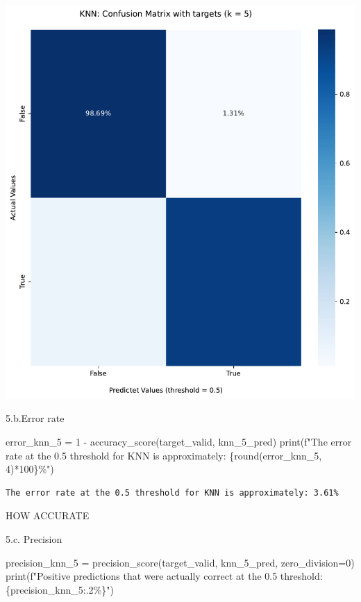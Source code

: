 \documentclass[
  11pt,
  letterpaper,
  DIV=11,
  numbers=noendperiod]{scrartcl}
\newenvironment{Shaded}{\begin{snugshade}}{\end{snugshade}}
\newcommand{\BuiltInTok}[1]{\textcolor[rgb]{0.00,0.23,0.31}{#1}}
\newcommand{\DecValTok}[1]{\textcolor[rgb]{0.68,0.00,0.00}{#1}}
\newcommand{\NormalTok}[1]{\textcolor[rgb]{0.00,0.23,0.31}{#1}}
\newcommand{\OperatorTok}[1]{\textcolor[rgb]{0.37,0.37,0.37}{#1}}
\newcommand{\SpecialCharTok}[1]{\textcolor[rgb]{0.37,0.37,0.37}{#1}}
\newcommand{\SpecialStringTok}[1]{\textcolor[rgb]{0.13,0.47,0.30}{#1}}
\begin{document}
\includegraphics{mp2_files/figure-pdf/cell-13-output-1.pdf}

5.b.Error rate

\begin{Shaded}
\begin{Highlighting}[]
\NormalTok{error\_knn\_5 }\OperatorTok{=} \DecValTok{1} \OperatorTok{{-}}\NormalTok{ accuracy\_score(target\_valid, knn\_5\_pred)}
\BuiltInTok{print}\NormalTok{(}\SpecialStringTok{f"The error rate at the 0.5 threshold for KNN is approximately: }\SpecialCharTok{\{}\BuiltInTok{round}\NormalTok{(error\_knn\_5, }\DecValTok{4}\NormalTok{)}\OperatorTok{*}\DecValTok{100}\SpecialCharTok{\}}\SpecialStringTok{\%"}\NormalTok{)}
\end{Highlighting}
\end{Shaded}

\begin{verbatim}
The error rate at the 0.5 threshold for KNN is approximately: 3.61%
\end{verbatim}

HOW ACCURATE

5.c. Precision

\begin{Shaded}
\begin{Highlighting}[]
\NormalTok{precision\_knn\_5 }\OperatorTok{=}\NormalTok{ precision\_score(target\_valid, knn\_5\_pred, zero\_division}\OperatorTok{=}\DecValTok{0}\NormalTok{)}
\BuiltInTok{print}\NormalTok{(}\SpecialStringTok{f"Positive predictions that were actually correct at the 0.5 threshold: }\SpecialCharTok{\{}\NormalTok{precision\_knn\_5}\SpecialCharTok{:.2\%\}}\SpecialStringTok{"}\NormalTok{)}
\end{Highlighting}
\end{Shaded}
\end{document}
